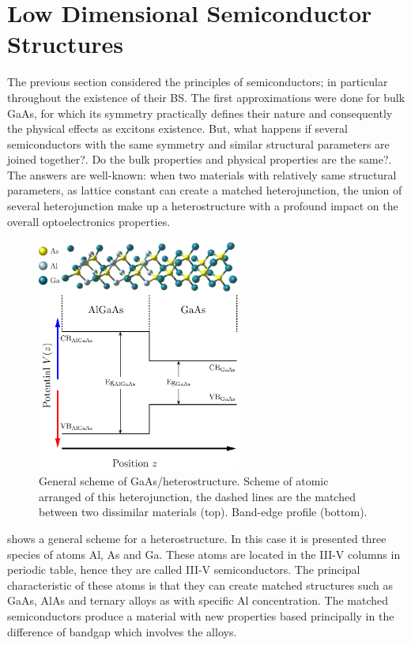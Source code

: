 \section{Low Dimensional Semiconductor Structures}
\label{sec:chapter-1-low-dimensional-structures}
\vspace{-10mm} 
The previous section considered the principles of semiconductors; in particular throughout the existence of their \gls{BS}. The first approximations were done for bulk GaAs, for which its symmetry practically defines their nature and consequently the physical effects as excitons existence.  But, what happens  if several semiconductors with the same symmetry and similar structural parameters are joined together?. Do the bulk properties and physical properties are the same?. 
The answers  are well-known: when two materials with relatively same structural parameters, as lattice constant can create a matched heterojunction, the union of several heterojunction make up a heterostructure with a profound impact on the overall optoelectronics properties.\\
\begin{figure}[ht!]
	\centering
	\includegraphics[width=0.6\textwidth]{../figures/chapter-1/heterostructures/build-ruco/hs-01}
	\caption{General scheme of GaAs/\algaas heterostructure. Scheme of atomic arranged of this heterojunction, the dashed lines are the matched between two dissimilar
	materials (top). Band-edge profile (bottom).}
	\label{fig:subsection-1.2-heterostructure}
\end{figure}
 shows  a general scheme for a heterostructure. In this case it is presented three species of atoms Al, As and Ga. These atoms are located in the III-V columns in periodic table, hence they are called III-V semiconductors. The principal characteristic of these atoms is that they can create matched structures such as GaAs, AlAs and ternary alloys as \algaas with specific Al concentration. The matched semiconductors produce a material with new properties based principally in the difference of bandgap which involves the alloys. 
